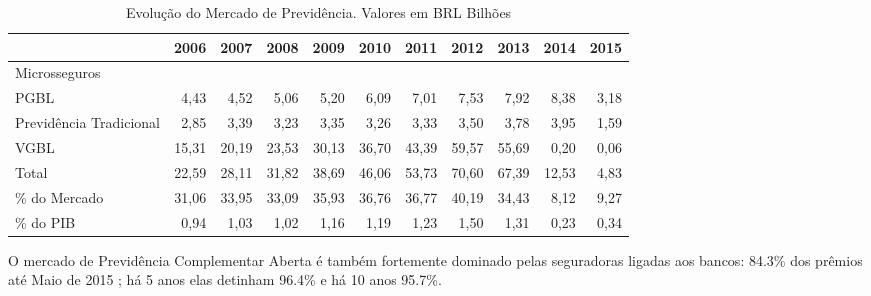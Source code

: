 \documentclass[../../relatorio.tex]{subfiles}
\begin{document}
\begin{table}[ht]
\centering
\begin{tabular}{lrrrrrrrrrr}
  \hline
 & 2006 & 2007 & 2008 & 2009 & 2010 & 2011 & 2012 & 2013 & 2014 & 2015 \\ 
  \hline
Microsseguros &  &  &  &  &  &  &  &  &  &  \\ 
  PGBL & 4,43 & 4,52 & 5,06 & 5,20 & 6,09 & 7,01 & 7,53 & 7,92 & 8,38 & 3,18 \\ 
  Previdência Tradicional & 2,85 & 3,39 & 3,23 & 3,35 & 3,26 & 3,33 & 3,50 & 3,78 & 3,95 & 1,59 \\ 
  VGBL & 15,31 & 20,19 & 23,53 & 30,13 & 36,70 & 43,39 & 59,57 & 55,69 & 0,20 & 0,06 \\ 
   \hline
Total & 22,59 & 28,11 & 31,82 & 38,69 & 46,06 & 53,73 & 70,60 & 67,39 & 12,53 & 4,83 \\ 
   \hline
\% do Mercado & 31,06 & 33,95 & 33,09 & 35,93 & 36,76 & 36,77 & 40,19 & 34,43 & 8,12 & 9,27 \\ 
   \hline
\% do PIB & 0,94 & 1,03 & 1,02 & 1,16 & 1,19 & 1,23 & 1,50 & 1,31 & 0,23 & 0,34 \\ 
   \hline
\end{tabular}
\caption{Evolução do Mercado de Previdência. Valores em BRL Bilhões} 
\end{table}
O mercado de Previdência Complementar Aberta é também fortemente dominado pelas seguradoras ligadas aos bancos: 84.3\% dos prêmios até Maio de 2015 ; há 5 anos elas detinham 96.4\% e há 10 anos 95.7\%.
\end{document}
